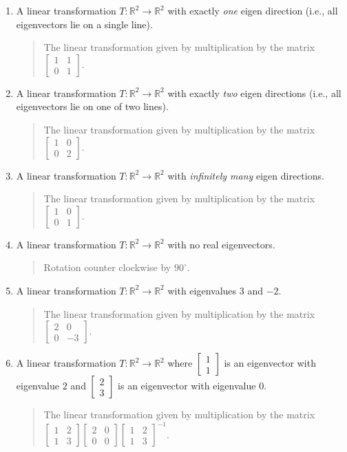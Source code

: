 \documentclass[letter]{article}
\newcommand{\R}{\mathbb{R}}
\newcommand{\mat}[1]{\begin{bmatrix}#1\end{bmatrix}}
\begin{document}
\begin{enumerate}
\begin{enumerate}
			\item A linear transformation $T:\R^2\to\R^2$ with exactly \emph{one} eigen direction (i.e., all eigenvectors lie on a single line).
			\begin{quote}
				The linear transformation given by multiplication by the matrix
				$\mat{1&1\\0&1}$.
			\end{quote}

			\item A linear transformation $T:\R^2\to\R^2$ with exactly \emph{two} eigen directions (i.e., all eigenvectors lie on one of two lines).
			\begin{quote}
				The linear transformation given by multiplication by the matrix
				$\mat{1&0\\0&2}$.
			\end{quote}

			\item A linear transformation $T:\R^2\to\R^2$ with \emph{infinitely many} eigen directions.
			\begin{quote}
				The linear transformation given by multiplication by the matrix
				$\mat{1&0\\0&1}$.
			\end{quote}

			\item A linear transformation $T:\R^2\to\R^2$ with no real eigenvectors.
			\begin{quote}
				Rotation counter clockwise by $90^{\circ}$.
			\end{quote}

			\item A linear transformation $T:\R^2\to\R^2$ with eigenvalues $3$ and $-2$.
			\begin{quote}
				The linear transformation given by multiplication by the matrix
				$\mat{2&0\\0&-3}$.
			\end{quote}

			\item A linear transformation $T:\R^2\to\R^2$ where $\mat{1\\1}$ is an eigenvector with eigenvalue $2$ and $\mat{2\\3}$
				is an eigenvector with eigenvalue $0$.
			\begin{quote}
				The linear transformation given by multiplication by the matrix
				$\mat{1&2\\1&3}\mat{2&0\\0&0}\mat{1&2\\1&3}^{-1}$.
			\end{quote}


\end{enumerate}
\end{enumerate}
\end{document}
